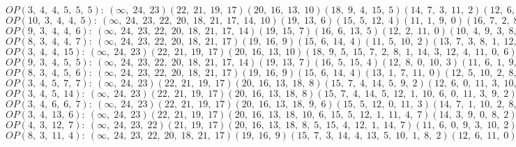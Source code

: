 $OP(3, \;4, \;4, \;5, \;5, \;5): \:(\infty, \;24, \;23)(22, \;21, \;19, \;17)(20, \;16, \;13, \;10)(18, \;9, \;4, \;15, \;5)(14, \;7, \;3, \;11, \;2)(12, \;6, \;0, \;8, \;1)$\\
$OP(10, \;3, \;4, \;4, \;5): \:(\infty, \;24, \;23, \;22, \;20, \;18, \;21, \;17, \;14, \;10)(19, \;13, \;6)(15, \;5, \;12, \;4)(11, \;1, \;9, \;0)(16, \;7, \;2, \;8, \;3)$\\
$OP(9, \;3, \;4, \;4, \;6): \:(\infty, \;24, \;23, \;22, \;20, \;18, \;21, \;17, \;14)(19, \;15, \;7)(16, \;6, \;13, \;5)(12, \;2, \;11, \;0)(10, \;4, \;9, \;3, \;8, \;1)$\\
$OP(8, \;3, \;4, \;4, \;7): \:(\infty, \;24, \;23, \;22, \;20, \;18, \;21, \;17)(19, \;16, \;9)(15, \;6, \;14, \;4)(11, \;5, \;10, \;2)(13, \;7, \;3, \;8, \;1, \;12, \;0)$\\
$OP(3, \;4, \;4, \;15): \:(\infty, \;24, \;23)(22, \;21, \;19, \;17)(20, \;16, \;13, \;10)(18, \;9, \;5, \;15, \;7, \;2, \;8, \;1, \;14, \;3, \;12, \;4, \;11, \;0, \;6)$\\
$OP(9, \;3, \;4, \;5, \;5): \:(\infty, \;24, \;23, \;22, \;20, \;18, \;21, \;17, \;14)(19, \;13, \;7)(16, \;5, \;15, \;4)(12, \;8, \;0, \;10, \;3)(11, \;6, \;1, \;9, \;2)$\\
$OP(8, \;3, \;4, \;5, \;6): \:(\infty, \;24, \;23, \;22, \;20, \;18, \;21, \;17)(19, \;16, \;9)(15, \;6, \;14, \;4)(13, \;1, \;7, \;11, \;0)(12, \;5, \;10, \;2, \;8, \;3)$\\
$OP(3, \;4, \;5, \;7, \;7): \:(\infty, \;24, \;23)(22, \;21, \;19, \;17)(20, \;16, \;13, \;18, \;8)(15, \;7, \;4, \;14, \;5, \;9, \;2)(12, \;6, \;0, \;11, \;3, \;10, \;1)$\\
$OP(3, \;4, \;5, \;14): \:(\infty, \;24, \;23)(22, \;21, \;19, \;17)(20, \;16, \;13, \;18, \;8)(15, \;7, \;4, \;14, \;5, \;12, \;1, \;10, \;6, \;0, \;11, \;3, \;9, \;2)$\\
$OP(3, \;4, \;6, \;6, \;7): \:(\infty, \;24, \;23)(22, \;21, \;19, \;17)(20, \;16, \;13, \;18, \;9, \;6)(15, \;5, \;12, \;0, \;11, \;3)(14, \;7, \;1, \;10, \;2, \;8, \;4)$\\
$OP(3, \;4, \;13, \;6): \:(\infty, \;24, \;23)(22, \;21, \;19, \;17)(20, \;16, \;13, \;18, \;10, \;6, \;15, \;5, \;12, \;1, \;11, \;4, \;7)(14, \;3, \;9, \;0, \;8, \;2)$\\
$OP(4, \;3, \;12, \;7): \:(\infty, \;24, \;23, \;22)(21, \;19, \;17)(20, \;16, \;13, \;18, \;8, \;5, \;15, \;4, \;12, \;1, \;14, \;7)(11, \;6, \;0, \;9, \;3, \;10, \;2)$\\
$OP(8, \;3, \;11, \;4): \:(\infty, \;24, \;23, \;22, \;20, \;18, \;21, \;17)(19, \;16, \;9)(15, \;7, \;3, \;14, \;4, \;13, \;5, \;10, \;1, \;8, \;2)(12, \;6, \;11, \;0)$\\
